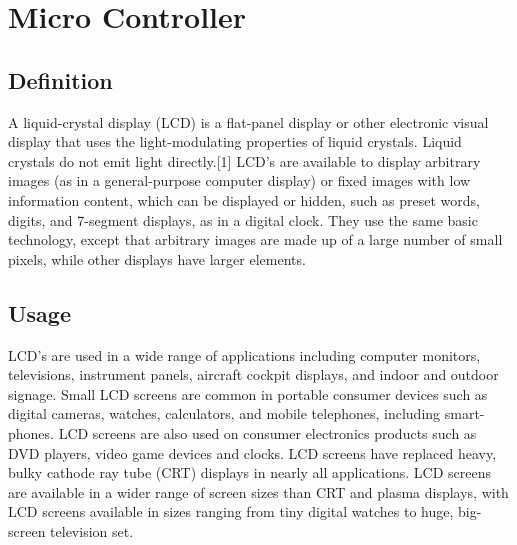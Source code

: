 \section{Micro Controller}

\subsection{Definition}
A liquid-crystal display (LCD) is a flat-panel display or other electronic visual display that uses the light-modulating properties of liquid crystals. Liquid crystals do not emit light directly.[1] LCD's are available to display arbitrary images (as in a general-purpose computer display) or fixed images with low information content, which can be displayed or hidden, such as preset words, digits, and 7-segment displays, as in a digital clock. They use the same basic technology, except that arbitrary images are made up of a large number of small pixels, while other displays have larger elements.


\subsection{Usage}
LCD's are used in a wide range of applications including computer monitors, televisions, instrument panels, aircraft cockpit displays, and indoor and outdoor signage. Small LCD screens are common in portable consumer devices such as digital cameras, watches, calculators, and mobile telephones, including smart-phones. LCD screens are also used on consumer electronics products such as DVD players, video game devices and clocks. LCD screens have replaced heavy, bulky cathode ray tube (CRT) displays in nearly all applications. LCD screens are available in a wider range of screen sizes than CRT and plasma displays, with LCD screens available in sizes ranging from tiny digital watches to huge, big-screen television set.


